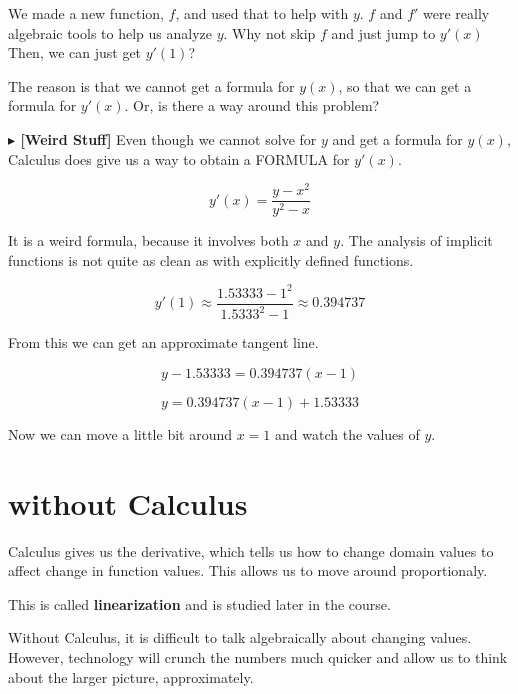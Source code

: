 \documentclass{ximera}
\begin{document}
We made a new function, $f$, and used that to help with $y$.  $f$ and $f'$ were really algebraic tools to help us analyze $y$. Why not skip $f$ and just jump to $y'(x)$  Then, we can just get $y'(1)$?

The reason is that we cannot get a formula for $y(x)$, so that we can get a formula for $y'(x)$. Or, is there a way around this problem?



\textbf{\textcolor{red!80!black}{$\blacktriangleright$  [Weird Stuff]}}  Even though we cannot solve for $y$ and get a formula for $y(x)$, Calculus does give us a way to obtain a FORMULA for $y'(x)$.



\[
y'(x) = \frac{y - x^2}{y^2 - x}
\]


It is a weird formula, because it involves both $x$ and $y$.  The analysis of implicit functions is not quite as clean as with explicitly defined functions.


\[
y'(1) \approx \frac{1.53333 - 1^2}{1.5333^2 - 1} \approx 0.394737
\]



From this we can get an approximate tangent line.

\[
y - 1.53333 = 0.394737(x-1)
\]


\[
y = 0.394737(x-1) + 1.53333
\]


Now we can move a little bit around $x=1$ and watch the values of $y$.



\begin{center}
\end{center}






\section{without Calculus}



Calculus gives us the derivative, which tells us how to change domain values to affect change in function values.  This allows us to move around proportionaly.  

This is called \textbf{linearization} and is studied later in the course.

Without Calculus, it is difficult to talk algebraically about changing values.  However, technology will crunch the numbers much quicker and allow us to think about the larger picture, approximately.
\end{document}
